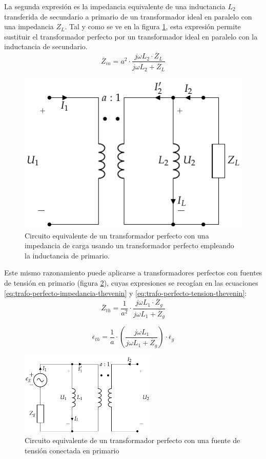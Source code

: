   La segunda expresión es la impedancia equivalente de una inductancia $L_2$ transferida de secundario a primario de un transformador ideal en paralelo con una impedancia $Z_L$. Tal y como se ve en la figura \ref{fig:trafo-perfecto-ideal-L2}, esta expresión permite sustituir el transformador perfecto por un transformador ideal en paralelo con la inductancia de secundario.
  \[
    \overline{Z}_{in} = a^2 \cdot \frac{j \omega L_2 \cdot
    \overline{Z}_L}{j\omega L_2 + \overline{Z}_L}
\]

  \begin{figure}
    \centering
    \includegraphics[height=.2\textheight]{../figs/TrafoPerfecto_Ideal2.pdf}
        \caption{Circuito equivalente de un transformador perfecto con una impedancia de carga usando un transformador perfecto empleando la inductancia de primario.
}
\label{fig:trafo-perfecto-ideal-L2}
  \end{figure}

  Este mismo razonamiento puede aplicarse a transformadores perfectos con fuentes de tensión en primario (figura \ref{fig:trafo-perfecto-ideal-V1}), cuyas expresiones se recogían en las ecuaciones \ref{eq:trafo-perfecto-impedancia-thevenin} y \ref{eq:trafo-perfecto-tension-thevenin}:
  \[
    \overline{Z}_{th} = \frac{1}{a^2} \cdot \frac{j \omega L_1 \cdot
    \overline{Z}_g}{j\omega L_1 + \overline{Z}_g}
  \]

  \[
    \overline{\epsilon}_{th} = \frac{1}{a} \cdot \left(\frac{j\omega
      L_1}{j\omega L_1 + \overline{Z}_g}\right) \cdot
    \overline{\epsilon}_g
  \]

  \begin{figure}
    \centering
    \includegraphics[height=4cm]{../figs/TrafoPerfecto_Ideal_FuentePrim.pdf}
    \caption{Circuito equivalente de un transformador perfecto con una fuente de tensión conectada en primario}
    \label{fig:trafo-perfecto-ideal-V1}
  \end{figure}

